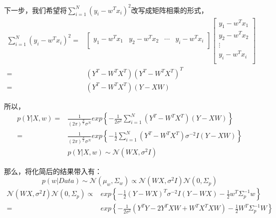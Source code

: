 \documentclass[a4paper]{article}
\begin{document}
下一步，我们希望将$\sum_{i=1}^N(y_i - w^Tx_i)^2$改写成矩阵相乘的形式，
\begin{equation}
    \begin{split}
        \sum_{i=1}^N(y_i - w^Tx_i)^2 = &
    \begin{bmatrix}
        y_1 - w^Tx_1 & y_2 - w^Tx_2 & \cdots & y_i - w^Tx_i \\
    \end{bmatrix}
    \begin{bmatrix}
        y_1 - w^Tx_1\\
        y_2 - w^Tx_2\\
        \vdots \\
        y_i - w^Tx_i \\
    \end{bmatrix} \\
    = & (Y^T - W^TX^T)(Y^T - W^TX^T)^T \\
    = & (Y^T - W^TX^T)(Y - XW)
    \end{split}
\end{equation}

所以，
\begin{equation}
    \begin{split}
        p(Y|X,w) = &  \frac{1}{(2\pi)^{\frac{N}{2}}\sigma^N} exp\left\{ -\frac{1}{2\sigma^2}\sum_{i=1}^N(Y^T - W^TX^T)(Y - XW) \right\} \\
        = &  \frac{1}{(2\pi)^{\frac{N}{2}}\sigma^N} exp\left\{ -\frac{1}{2}\sum_{i=1}^N(Y^T - W^TX^T)\sigma^{-2}I(Y - XW) \right\} \\
        & p(Y|X,w) \sim \mathcal{N}(WX,\sigma^2I)
    \end{split}
\end{equation}

那么，将化简后的结果带入有：
\begin{equation}
    p(w|Data) \sim \mathcal{N}(\mu_w,\Sigma_w) \propto \mathcal{N}(WX,\sigma^2I) \mathcal{N}(0,\Sigma_p)
\end{equation}
\begin{equation}
    \begin{split}
        \mathcal{N}(WX,\sigma^2I) \mathcal{N}(0,\Sigma_p) \propto & exp\left\{ -\frac{1}{2}(Y-WX)^T\sigma^{-2}I(Y-WX) - \frac{1}{2} w^T\Sigma_p^{-1}w \right\}\\
        = & exp\left\{ -\frac{1}{2\sigma^2}(Y^TY - 2Y^TXW + W^TX^TXW) - \frac{1}{2} W^T\Sigma_p^{-1}W \right\} \\
    \end{split}
\end{equation}
\end{document}
